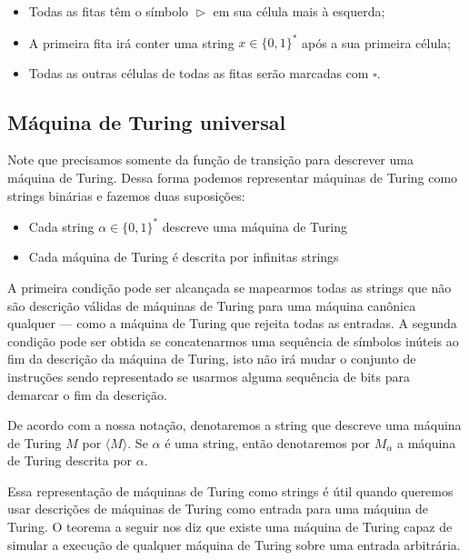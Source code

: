 \begin{itemize}

\item Todas as fitas têm o símbolo $\vartriangleright$ em sua célula mais à esquerda;

\item A primeira fita irá conter uma string $x \in \{0, 1\}^{*}$ após a sua primeira célula;

\item Todas as outras células de todas as fitas serão marcadas com $\square$.

\end{itemize}


\subsection{Máquina de Turing universal}

Note que precisamos somente da função de transição para descrever uma máquina de Turing. Dessa forma podemos representar máquinas de Turing como strings binárias e fazemos duas suposições:

\begin{itemize}

\item Cada string $\alpha \in \{0, 1\}^{*}$ descreve uma máquina de Turing

\item Cada máquina de Turing é descrita por infinitas strings

\end{itemize}

A primeira condição pode ser alcançada se mapearmos todas as strings que não são descrição válidas de máquinas de Turing para uma máquina canônica qualquer --- como a máquina de Turing que rejeita todas as entradas. A segunda condição pode ser obtida se concatenarmos uma sequência de símbolos inúteis ao fim da descrição da máquina de Turing, isto não irá mudar o conjunto de instruções sendo representado se usarmos alguma sequência de bits para demarcar o fim da descrição.

De acordo com a nossa notação, denotaremos a string que descreve uma máquina de Turing $M$ por $\langle M \rangle$. Se $\alpha$ é uma string, então denotaremos por $M_{\alpha}$ a máquina de Turing descrita por $\alpha$.

Essa representação de máquinas de Turing como strings é útil quando queremos usar descrições de máquinas de Turing como entrada para uma máquina de Turing. O teorema a seguir nos diz que existe uma máquina de Turing capaz de simular a execução de qualquer máquina de Turing sobre uma entrada arbitrária.

